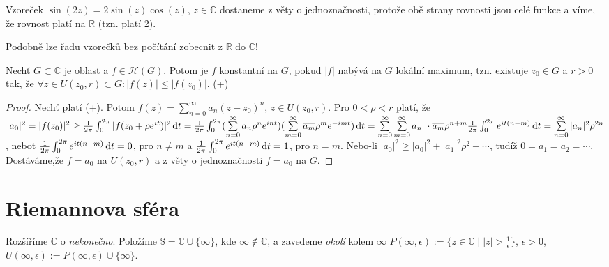 \begin{example}
Vzoreček $\sin (2z)=2\sin (z) \cos (z)$, $z \in \mathbb{C}$ dostaneme z věty o jednoznačnosti, protože obě strany rovnosti jsou celé funkce a víme, že rovnost platí na $\mathbb{R}$ (tzn. platí 2).
\end{example}

\begin{note}
Podobně lze řadu vzorečků bez počítání zobecnit z $\mathbb{R}$ do $\mathbb{C}$!
\end{note}

\begin{theorem}
Nechť $G \subset \mathbb{C}$ je oblast a $f\in \mathcal{H}(G)$. Potom je $f$ konstantní na $G$, pokud $|f|$ nabývá na $G$ lokální maximum, tzn. existuje $z_0 \in G$ a $r>0$ tak, že $\forall z \in U(z_0,r) \subset G: |f(z)| \leq |f(z_0)|$. (+)
\end{theorem}

\begin{proof}
Nechť platí (+). Potom $f(z)=\sum\limits_{n=0}^\infty a_n(z-z_0)^{n}$, $z\in U(z_0,r)$. Pro $0<\rho<r$ platí, že $|a_0|^2=|f(z_0)|^2\geq \frac{1}{2 \pi} \int_{0}^{2 \pi} |f(z_0+\rho e^{it})|^2 \diff t=%
\frac{1}{2 \pi} \int_{0}^{2 \pi} (\sum\limits_{n=0}^\infty a_n \rho^n e^{int})(\sum\limits_{m=0}^\infty \overline{a_m} \rho^m e^{-imt}) \diff t=%
\sum\limits_{n=0}^\infty \sum\limits_{m=0}^\infty a_n\ \cdot \overline{a_m} \rho^{n+m} \frac{1}{2 \pi} \int_{0}^{2 \pi}  e^{it(n-m)} \diff t=\sum\limits_{n=0}^\infty |a_n|^2\rho^{2n}$, nebot $\frac{1}{2 \pi} \int_{0}^{2 \pi}  e^{it(n-m)} \mathop{}\!\mathrm{d} t=0$, pro $n\neq m$ a \newline $\frac{1}{2 \pi} \int_{0}^{2 \pi}  e^{it(n-m)} \mathop{}\!\mathrm{d} t=1$, pro $n=m$.
Nebo-li $|a_0|^2\geq|a_0|^2+|a_1|^2\rho^2+\cdots$, tudíž $0=a_1=a_2=\cdots$. Dostáváme,že $f=a_0$ na $U(z_0,r)$ a z věty o jednoznačnosti $f=a_0$ na $G$.
\end{proof}

\section{\texorpdfstring{Riemannova sféra}{Riemannova sféra}}
Rozšíříme $\mathbb{C}$ o \emph{nekonečno}.
Položíme $\$=\mathbb{C}\cup\{\infty\}$, kde $\infty\notin\mathbb{C}$, a zavedeme \emph{okolí} kolem $\infty$
$P(\infty,\epsilon):=\{z\in\mathbb{C}\mid |z|>\frac{1}{\epsilon}\}$, $\epsilon>0$,
$U(\infty,\epsilon):=P(\infty,\epsilon)\cup \{\infty\}$.

